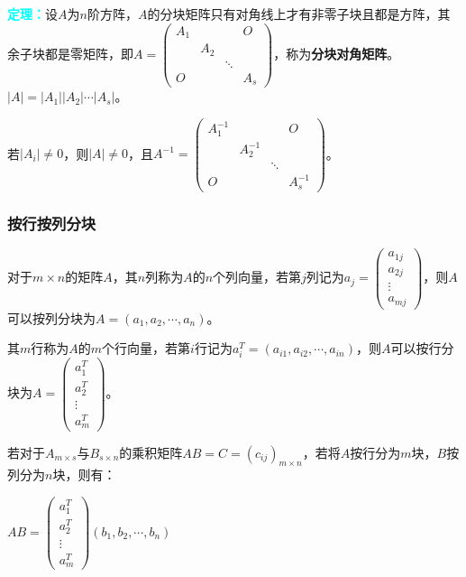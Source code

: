 \documentclass[UTF8, 12pt]{ctexart}
\begin{document}
\textcolor{aqua}{\textbf{定理：}}设$A$为$n$阶方阵，$A$的分块矩阵只有对角线上才有非零子块且都是方阵，其余子块都是零矩阵，即$A=\left(
    \begin{array}{cccc}
        A_1 & & & O \\
         & A_2 & \\
         & & \ddots & \\
        O & & & A_s
    \end{array}
\right)$，称为\textbf{分块对角矩阵}。$\vert A\vert=\vert A_1\vert\vert A_2\vert\cdots\vert A_s\vert$。

若$\vert A_i\vert\neq0$，则$\vert A\vert\neq0$，且$A^{-1}=\left(
    \begin{array}{cccc}
        A_1^{-1} & & & O \\
         & A_2^{-1} & \\
         & & \ddots & \\
        O & & & A_s^{-1}
    \end{array}
\right)$。

\subsubsection{按行按列分块}

对于$m\times n$的矩阵$A$，其$n$列称为$A$的$n$个列向量，若第$j$列记为$a_j=\left(
    \begin{array}{c}
        a_{1j} \\
        a_{2j} \\
        \vdots \\
        a_{mj}
    \end{array}
\right)$，则$A$可以按列分块为$A=(a_1,a_2,\cdots,a_n)$。\medskip

其$m$行称为$A$的$m$个行向量，若第$i$行记为$a_i^T=(a_{i1},a_{i2},\cdots,a_{in})$，则$A$可以按行分块为$A=\left(\begin{array}{c}
    a_1^T \\
    a_2^T \\
    \vdots \\
    a_{m}^T
\end{array}\right)$。

若对于$A_{m\times s}$与$B_{s\times n}$的乘积矩阵$AB=C=(c_{ij})_{m\times n}$，若将$A$按行分为$m$块，$B$按列分为$n$块，则有：\medskip

$AB=\left(
    \begin{array}{c}
        a_1^T \\
        a_2^T \\
        \vdots \\
        a_{m}^T
    \end{array}
\right)(b_1,b_2,\cdots,b_n)$
\end{document}
